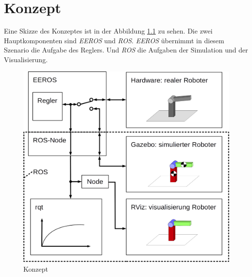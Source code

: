\chapter{Konzept}

Eine Skizze des Konzeptes ist in der Abbildung \ref{Ab:konzept}
zu sehen.
Die zwei Hauptkomponenten sind \textit{EEROS} und \textit{ROS}.
\textit{EEROS} übernimmt in diesem Szenario die Aufgabe des Reglers.
Und \textit{ROS} die Aufgaben der Simulation und der Visualisierung.

\begin{figure}[ht!]
	\centering
	\includegraphics[width=14.5cm]{images/Konzept.png}
	\caption{Konzept}
	\label{Ab:konzept}
\end{figure}

